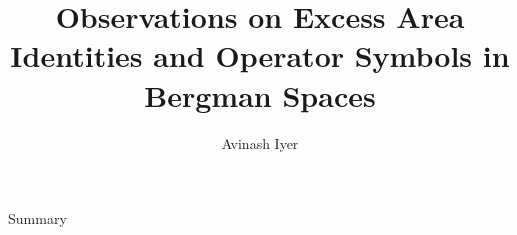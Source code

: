 \documentclass{reu_beamer}
\title[]{Observations on Excess Area Identities and Operator Symbols in Bergman Spaces}
\author{
    Avinash Iyer
}
\institute{Occidental College}
\date{}
\begin{document}
\begin{frame}
    \begin{figure}[h]
        \centering
    \end{figure}
    \maketitle
\end{frame}
\begin{frame}{Summary}
\tableofcontents
\end{frame}
\end{document}
